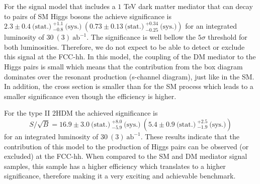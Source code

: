 For the signal model that includes a $1$ TeV dark matter mediator that can decay to pairs of SM Higgs bosons the achieve significance is $2.3\pm0.4~\text{(stat.)}~^{+1.1}_{-0.8}~\text{(sys.)}~\left(0.73\pm0.13~\text{(stat.)}~^{+0.34}_{-0.25}~\text{(sys.)}\right)$ for an integrated luminosity of $30~(3)~\text{ab}^{-1}$. The significance is well bellow the $5\sigma$ threshold for both luminosities. Therefore, we do not expect to be able to detect or exclude this signal at the FCC-hh. In this model, the coupling of the DM mediator to the Higgs pairs is small which means that the contribution from the box diagram dominates over the resonant production (s-channel diagram), just like in the SM. In addition, the cross section is smaller than for the SM process which leads to a smaller significance even though the efficiency is higher.

For the type II 2HDM the achieved significance is
\begin{equation}
	S/\sqrt{B}=16.9\pm 3.0~\text{(stat.)}~^{+8.0}_{-5.9}~\text{(sys.)}~\left(5.4\pm 0.9~\text{(stat.)}~^{+2.5}_{-1.9}~\text{(sys.)}\right)
\end{equation}
for an integrated luminosity of $30~(3)~\text{ab}^{-1}$. These results indicate that the contribution of this model to the production of Higgs pairs can be observed (or excluded) at the FCC-hh. When compared to the SM and DM mediator signal samples, this sample has a higher efficiency which translates to a higher significance, therefore making it a very exciting and achievable benchmark.

